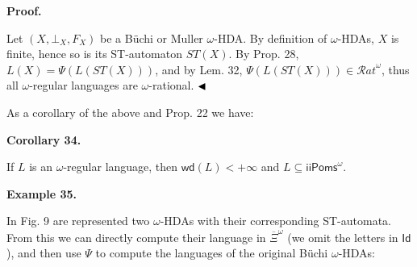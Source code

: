 \documentclass[10pt,a4paper]{article}
\begin{document}
 

 

 
\par\medskip\noindent\textbf{Proof.}\par
 
 
Let $(X,\bot_{X},F_{X})$ be a Büchi or Muller $\omega$-HDA. By definition of $\omega$-HDAs, $X$ is finite, hence so is its ST-automaton $ST(X)$. By Prop. 28, $L(X)=\Psi(L(ST(X)))$, and by Lem. 32, $\Psi(L(ST(X)))\in{\mathcal{R}at}^{\omega}$, thus all $\omega$-regular languages are $\omega$-rational. $\hfill\blacktriangleleft$\par
 
 
 
As a corollary of the above and Prop. 22 we have:\par
 
 
 
\par\medskip\noindent\textbf{Corollary 34.}\par
 
 
If $L$ is an $\omega$-regular language, then $\mathsf{wd}(L)<+\infty$ and $L\subseteq{\mathsf{iiPoms}^{\omega}}$.\par
 
 
 
 
\par\medskip\noindent\textbf{Example 35.}\par
 
 
In Fig. 9 are represented two $\omega$-HDAs with their corresponding ST-automata. From this we can directly compute their language in $\overline{\Xi}^{\omega}$ (we omit the letters in $\mathsf{Id}$), and then use $\Psi$ to compute the languages of the original Büchi $\omega$-HDAs:\par
 
 
 
\end{document}
